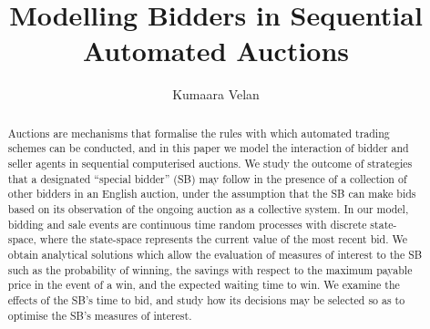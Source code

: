 \documentclass{comjnl}
\begin{document}
\title[Modelling Bidders in Sequential Automated Auctions]{Modelling Bidders in Sequential Automated Auctions}
\author{Kumaara Velan}
 

 




\begin{abstract}
Auctions are mechanisms that formalise the rules with which
automated trading schemes can be conducted, and in this paper we
model the interaction of bidder and seller agents in sequential
computerised auctions. We study the outcome of strategies that a
designated ``special bidder'' (SB) may follow in the presence of a
collection of other bidders in an English auction, under the
assumption that the SB can make bids based on its observation of
the ongoing auction as a collective system. In our model, bidding
and sale events are continuous time random processes with discrete
state-space, where the state-space represents the current value of
the most recent bid. We obtain analytical solutions which allow
the evaluation of measures of interest to the SB such as the
probability of winning, the savings with respect to the maximum
payable price in the event of a win, and the expected waiting time
to win. We examine the effects of the SB's time to bid, and study
how its decisions may be selected so as to optimise the SB's
measures of interest.
\end{abstract}

\maketitle

%
%
%
%



\nocite{*}



\end{document}
